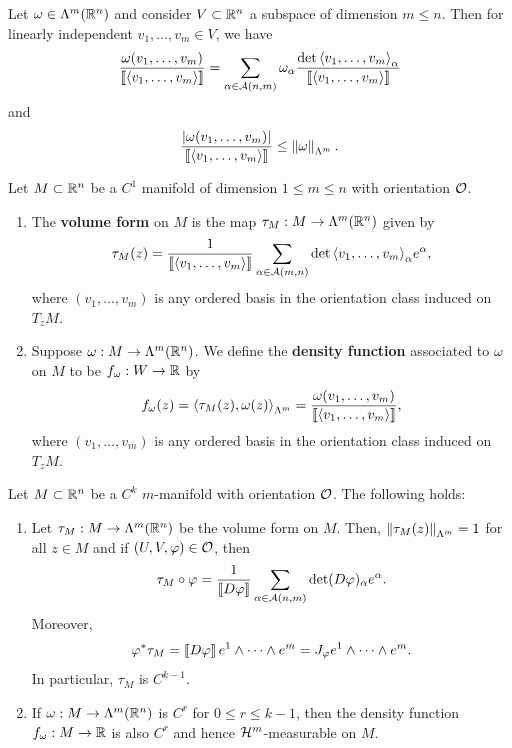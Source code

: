 \documentclass[a4paper]{article}
\begin{document}
\begin{lemma}
Let $\omega \in \Lambda^m(\mathbb{R}^n)$ and consider $V \subset \mathbb{R}^n$ 
a subspace of dimension $m \leq n$. Then for linearly 
independent $v_1, \dots, v_m \in V$, we have 
\[
\frac{\omega(v_1, \dots, v_m)}{\left\llbracket \left\langle v_1, \dots, v_m \right\rangle \right\rrbracket}
= \sum_{\alpha \in \mathcal{A}(n, m)} \omega_\alpha 
\frac{\det \left\langle v_1, \dots, v_m \right\rangle_\alpha}
{\left\llbracket \left\langle v_1, \dots, v_m \right\rangle \right\rrbracket}
\]
and 
\[
\frac{\left\lvert \omega(v_1, \dots, v_m)\right\rvert}{\left\llbracket \left\langle v_1, \dots, v_m \right\rangle \right\rrbracket}
\leq \left\lVert \omega\right\rVert_{\Lambda^m}.
\]
\end{lemma}

\begin{defi}
Let $M \subset \mathbb{R}^n$ be a $C^1$ manifold of dimension 
$1 \leq m \leq n$ with orientation $\mathcal{O}$. 
\begin{enumerate}
\item The \textbf{volume form} on $M$ is the map $\tau_M : M \to 
\Lambda^m(\mathbb{R}^n)$ given by 
\[
\tau_M(z) = \frac{1}{\left\llbracket \left\langle v_1, \dots, v_m \right\rangle \right\rrbracket} 
\sum_{\alpha \in \mathcal{A}(m, n)} \det 
{\left\langle v_1, \dots, v_m \right\rangle}_\alpha e^\alpha,
\]
where $(v_1, \dots, v_m)$ is any ordered basis in the orientation
class induced on $T_z M$.

\item Suppose $\omega : M \to \Lambda^m(\mathbb{R}^n)$. We define 
the \textbf{density function} associated to $\omega$ on $M$
to be $f_\omega : W \to \mathbb{R}$ by 
\[
f_\omega (z) = \left\langle \tau_M(z), \omega(z) \right\rangle_{\Lambda^m} 
= \frac{\omega(v_1, \dots, v_m)}{\left\llbracket \left\langle v_1, \dots, v_m \right\rangle \right\rrbracket},
\]
where $(v_1, \dots, v_m)$ is any ordered basis in the orientation
class induced on $T_z M$.
\end{enumerate}
\end{defi}

\begin{prop}
Let $M \subset \mathbb{R}^n$ be a $C^k$ $m$-manifold with orientation 
$\mathcal{O}$. The following holds: 
\begin{enumerate}
\item Let $\tau_M : M \to \Lambda^m(\mathbb{R}^n)$ be the volume
form on $M$. Then, $\left\lVert \tau_M(z)\right\rVert_{\Lambda^m} = 1$
for all $z \in M$ and if $(U, V, \varphi) \in \mathcal{O}$, then 
\[
\tau_M \circ \varphi = 
\frac{1}{\left\llbracket D\varphi \right\rrbracket} \sum_{\alpha \in \mathcal{A}(n, m)}
\det (D \varphi)_\alpha e^\alpha.
\] 
Moreover, 
\[
\varphi^* \tau_M = \left\llbracket D \varphi \right\rrbracket e^1 \wedge \dots \wedge 
e^m = J_\varphi e^1 \wedge \dots \wedge e^m.
\]
In particular, $\tau_M$ is $C^{k-1}$.

\item If $\omega : M \to \Lambda^m(\mathbb{R}^n)$ is $C^r$ for 
$0 \leq r \leq k - 1$, then the density function $f_\omega 
: M \to \mathbb{R}$ is also $C^r$ and hence $\mathcal{H}^m$-measurable 
on $M$.
\end{enumerate}
\end{prop}
\end{document}
